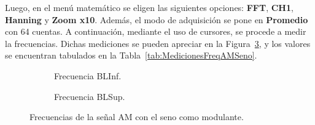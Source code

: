       Luego, en el menú matemático se eligen las siguientes opciones: \textbf{FFT}, \textbf{CH1},
      \textbf{Hanning} y \textbf{Zoom x10}. Además, el modo de adquisición se pone en \textbf{Promedio} con 
      64 cuentas. A continuación, mediante el uso de cursores, se procede a medir la frecuencias. Dichas mediciones se 
      pueden apreciar en la Figura~\ref{fig:FreqAMSeno}, y los valores se encuentran tabulados en la 
      Tabla~\ref{tab:MedicionesFreqAMSeno}.

      \begin{figure}[H]
        \centering
        \begin{subfigure}[H]{0.48\textwidth}
          \caption{Frecuencia BLInf.}
          \label{fig:FreqBLInfAMSeno}
        \end{subfigure}
        \hfill 
        \begin{subfigure}[H]{0.48\textwidth}
          \caption{Frecuencia BLSup.}
          \label{fig:FreqBLSupAMSeno}
        \end{subfigure}
      
        \caption{Frecuencias de la señal AM con el seno como modulante.}
        \label{fig:FreqAMSeno}
      \end{figure}

